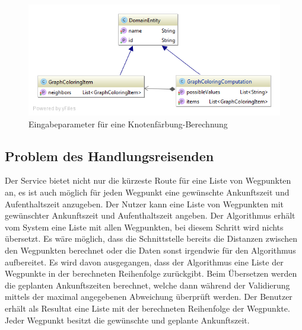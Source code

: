 \begin{figure}[h]
\centering
\includegraphics[scale=0.5]{images/probleme/graphcoloring.png}
\caption[Eingabeparameter für eine Knotenfärbung-Berechnung]{Eingabeparameter für eine Knotenfärbung-Berechnung \selfmade{}}
\label{fig:graphcoloring_input}
\end{figure}

%
%
%
%

\subsection{Problem des Handlungsreisenden}
Der Service bietet nicht nur die kürzeste Route für eine Liste von Wegpunkten an, es ist auch möglich für jeden Wegpunkt eine gewünschte Ankunftszeit und Aufenthaltszeit anzugeben. Der 
Nutzer kann eine Liste von Wegpunkten mit gewünschter Ankunftszeit und Aufenthaltszeit angeben. Der Algorithmus erhält vom System eine Liste mit allen Wegpunkten, bei diesem Schritt wird 
nichts übersetzt. Es wäre möglich, dass die Schnittstelle bereits die Distanzen zwischen den Wegpunkten berechnet oder die Daten sonst irgendwie für den Algorithmus aufbereitet. Es 
wird davon ausgegangen, dass der Algorithmus eine Liste der Wegpunkte in der berechneten Reihenfolge zurückgibt. Beim Übersetzen werden die geplanten Ankunftszeiten berechnet, 
welche dann während der Validierung mittels der maximal angegebenen Abweichung überprüft werden. Der Benutzer erhält als Resultat eine Liste mit der berechneten Reihenfolge der 
Wegpunkte. Jeder Wegpunkt besitzt die gewünschte und geplante Ankunftszeit.

